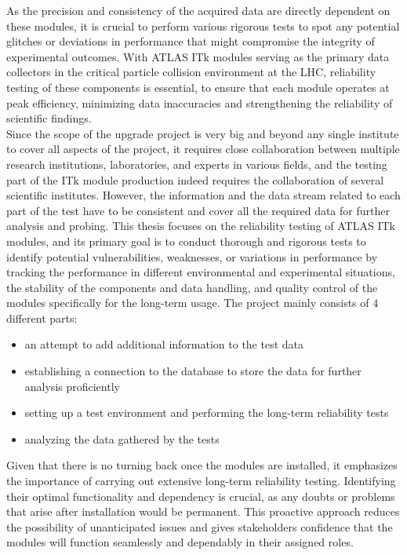 As the precision and consistency of the acquired data are directly dependent on these modules, it is crucial to perform various rigorous tests to spot any potential glitches or deviations in performance that might compromise the integrity of experimental outcomes. With ATLAS ITk modules serving as the primary data collectors in the critical particle collision environment at the LHC, reliability testing of these components is essential, to ensure that each module operates at peak efficiency, minimizing data inaccuracies and strengthening the reliability of scientific findings.\\
Since the scope of the upgrade project is very big and beyond any single institute to cover all aspects of the project, it requires close collaboration between multiple research institutions, laboratories, and experts in various fields, and the testing part of the ITk module production indeed requires the collaboration of several scientific institutes. However, the information and the data stream related to each part of the test have to be consistent and cover all the required data for further analysis and probing. This thesis focuses on the reliability testing of ATLAS ITk modules, and its primary goal is to conduct thorough and rigorous tests to identify potential vulnerabilities, weaknesses, or variations in performance by tracking the performance in different environmental and experimental situations, the stability of the components and data handling, and quality control of the modules specifically for the long-term usage. The project mainly consists of $4$ different parts: 
\begin{itemize}
    \item an attempt to add additional information to the test data
    \item establishing a connection to the database to store the data for further analysis proficiently
    \item setting up a test environment and performing the long-term reliability tests
    \item analyzing the data gathered by the tests
\end{itemize}

Given that there is no turning back once the modules are installed, it emphasizes the importance of carrying out extensive long-term reliability testing. Identifying their optimal functionality and dependency is crucial, as any doubts or problems that arise after installation would be permanent. This proactive approach reduces the possibility of unanticipated issues and gives stakeholders confidence that the modules will function seamlessly and dependably in their assigned roles.\\

